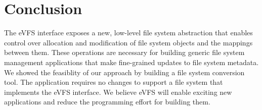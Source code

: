 \documentclass[letterpaper,twocolumn,10pt]{article}
\begin{document}

\vspace{-0.75em}
\section{Conclusion\label{sec:Conclusion}}
\vspace{-0.25em}

The eVFS interface exposes a new, low-level file system abstraction that enables control over allocation and modification of file system objects and the mappings between them. These operations are necessary for building generic file system management applications that make fine-grained updates to file system metadata. We showed the feasiblity of our approach by building a file system conversion tool. The application requires no changes to support a file system that implements the eVFS interface. We believe eVFS will enable exciting new applications and reduce the programming effort for building them.


{\footnotesize 
}
\end{document}
